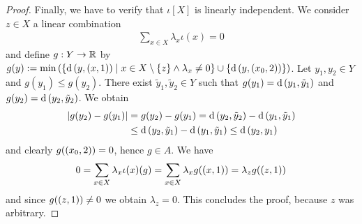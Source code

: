 \begin{proof}
	
	Finally, we have to verify that $\iota[X]$ is linearly independent. We consider $z \in X$ a linear combination 
	\begin{align*}
		\sum_{x \in X} \lambda_x \iota(x) = 0
	\end{align*}
	and define $g: Y \to \mathbb R$ by $g(y) := \min{\left ( {\left \{ \operatorname{d}{\left ( y, (x, 1) \right )} \mid x \in X \setminus \{z\} \land \lambda_x \neq 0 \right \}} \cup {\left \{ \operatorname{d}{\left ( y, {\left ( x_0, 2 \right )} \right )} \right \}} \right )}$. Let $y_1, y_2 \in Y$ and \Wlog $g(y_1) \leq g(y_2)$. There exist $\tilde{y}_1, \tilde{y}_2 \in Y$ such that $g(y_1) = \operatorname{d}{\left ( y_1, \tilde{y}_1 \right )}$ and $g(y_2) = \operatorname{d}{\left ( y_2, \tilde{y}_2 \right )}$. We obtain
	\begin{align*}
		{\left | g(y_2) - g(y_1) \right |} &= g(y_2) - g(y_1) = \operatorname{d}{\left ( y_2, \tilde{y}_2 \right )} - \operatorname{d}{\left ( y_1, \tilde{y}_1 \right )} \\
		&\leq \operatorname{d}{\left ( y_2, \tilde{y}_1 \right )} - \operatorname{d}{\left ( y_1, \tilde{y}_1 \right )} \leq \operatorname{d}{\left ( y_2, y_1 \right )}
	\end{align*}
	and clearly $g{\left ( {\left ( x_0, 2 \right )} \right )} = 0$, hence $g \in A$. We have
	\begin{align*}
		0 = \sum_{x \in X} \lambda_x \iota(x)(g) = \sum_{x \in X} \lambda_x g{\left ( {\left ( x, 1 \right )} \right )} = \lambda_z g({\left ( z, 1 \right )})
	\end{align*}
	and since $g{\left ( {\left ( z, 1 \right )} \right )} \neq 0$ we obtain $\lambda_z = 0$. This concludes the proof, because $z$ was arbitrary.  
\end{proof}


